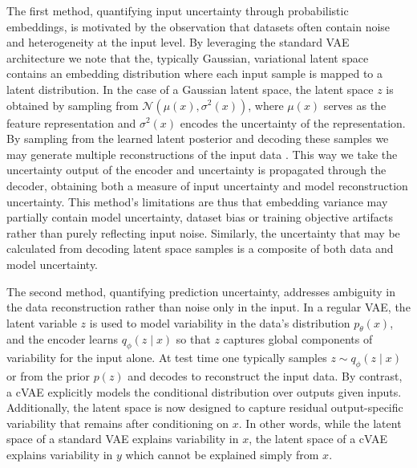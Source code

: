 The first method, quantifying input uncertainty through probabilistic embeddings, is motivated by the observation that datasets often contain noise and heterogeneity at the input level. By leveraging the standard VAE architecture we note that the, typically Gaussian, variational latent space contains an embedding distribution where each input sample is mapped to a latent distribution. In the case of a Gaussian latent space, the latent space \(z\) is obtained by sampling from \(\mathcal{N}(\mu(x),\sigma^2(x))\), where \(\mu(x)\) serves as the feature representation and \(\sigma^2(x)\) encodes the uncertainty of the representation. By sampling from the learned latent posterior and decoding these samples we may generate multiple reconstructions of the input data \cite{Edupuganti2021}. This way we take the uncertainty output of the encoder and uncertainty is propagated through the decoder, obtaining both a measure of input uncertainty and model reconstruction uncertainty. This method's limitations are thus that embedding variance may partially contain model uncertainty, dataset bias or training objective artifacts rather than purely reflecting input noise. Similarly, the uncertainty that may be calculated from decoding latent space samples is a composite of both data and model uncertainty.

The second method, quantifying prediction uncertainty, addresses ambiguity in the data reconstruction rather than noise only in the input. In a regular VAE, the latent variable $z$ is used to model variability in the data's distribution $p_\theta(x)$, and the encoder learns $q_\phi(z\mid x)$ so that $z$ captures global components of variability for the input alone. At test time one typically samples $z\sim q_\phi(z\mid x)$ or from the prior $p(z)$ and decodes to reconstruct the input data. By contrast, a cVAE explicitly models the conditional distribution over outputs given inputs. Additionally, the latent space is now designed to capture residual output-specific variability that remains after conditioning on $x$. In other words, while the latent space of a standard VAE explains variability in $x$, the latent space of a cVAE explains variability in $y$ which cannot be explained simply from $x$.

